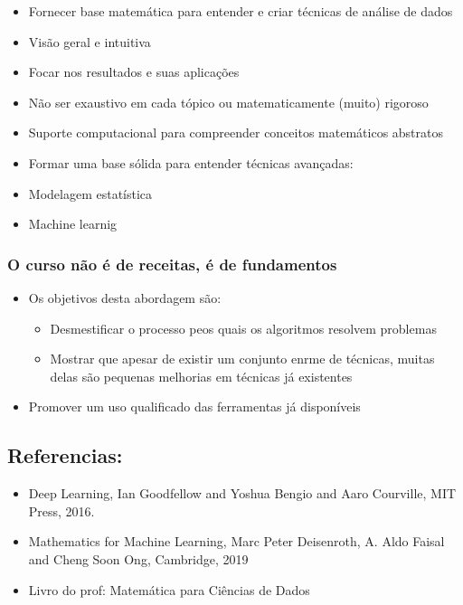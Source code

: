 \documentclass[
]{article}
\providecommand{\tightlist}{%
  \setlength{\itemsep}{0pt}\setlength{\parskip}{0pt}}
\begin{document}
\begin{itemize}
\tightlist
\item
  Fornecer base matemática para entender e criar técnicas de análise de
  dados
\item
  Visão geral e intuitiva
\item
  Focar nos resultados e suas aplicações
\item
  Não ser exaustivo em cada tópico ou matematicamente (muito) rigoroso
\item
  Suporte computacional para compreender conceitos matemáticos abstratos
\item
  Formar uma base sólida para entender técnicas avançadas:
\item
  Modelagem estatística
\item
  Machine learnig
\end{itemize}

\hypertarget{o-curso-nuxe3o-uxe9-de-receitas-uxe9-de-fundamentos}{%
\subsubsection{O curso não é de receitas, é de
fundamentos}\label{o-curso-nuxe3o-uxe9-de-receitas-uxe9-de-fundamentos}}

\begin{itemize}
\tightlist
\item
  Os objetivos desta abordagem são:

  \begin{itemize}
  \tightlist
  \item
    Desmestificar o processo peos quais os algoritmos resolvem problemas
  \item
    Mostrar que apesar de existir um conjunto enrme de técnicas, muitas
    delas são pequenas melhorias em técnicas já existentes
  \end{itemize}
\item
  Promover um uso qualificado das ferramentas já disponíveis
\end{itemize}

\hypertarget{referencias}{%
\subsection{Referencias:}\label{referencias}}

\begin{itemize}
\tightlist
\item
  Deep Learning, Ian Goodfellow and Yoshua Bengio and Aaro Courville,
  MIT Press, 2016.
\item
  Mathematics for Machine Learning, Marc Peter Deisenroth, A. Aldo
  Faisal and Cheng Soon Ong, Cambridge, 2019
\item
  Livro do prof: Matemática para Ciências de Dados
\end{itemize}
\end{document}
